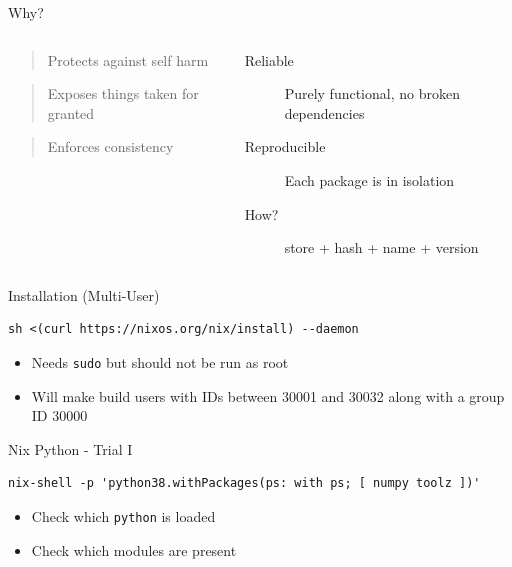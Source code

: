 \documentclass[bigger,unknownkeysallowed,aspectratio=169,colorblocks]{beamer}
\begin{document}
\begin{frame}[label={sec:org5e350d2}]{Why?}
\begin{columns}
\begin{column}{0.4\columnwidth}
\begin{quote}
Protects against self harm
\end{quote}
\begin{quote}
Exposes things taken for granted
\end{quote}
\begin{quote}
Enforces consistency
\end{quote}
\end{column}
\begin{column}{0.6\columnwidth}
\begin{description}
\item[{Reliable}] Purely functional, no broken dependencies
\item[{Reproducible}] Each package is in isolation
\item[{How?}] store + hash + name + version
\end{description}
\end{column}
\end{columns}
\end{frame}
\begin{frame}[label={sec:org2c2749e},fragile]{Installation (Multi-User)}
 \begin{verbatim}
sh <(curl https://nixos.org/nix/install) --daemon
\end{verbatim}
\begin{itemize}
\item Needs \texttt{sudo} but should not be run as root
\item Will make build users with IDs between 30001 and 30032 along with a group ID 30000
\end{itemize}
\end{frame}
\begin{frame}[label={sec:orga5c7edc},fragile]{Nix Python - Trial I}
 \begin{verbatim}
nix-shell -p 'python38.withPackages(ps: with ps; [ numpy toolz ])'
\end{verbatim}

\begin{itemize}
\item Check which \texttt{python} is loaded
\item Check which modules are present
\end{itemize}
\end{frame}
\end{document}
